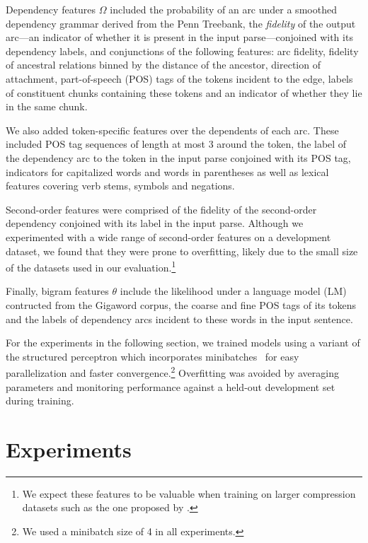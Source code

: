 \documentclass[11pt,a4paper]{article}
\begin{document}
Dependency features $\Omega$ included the probability of an arc under
a smoothed dependency grammar derived from the Penn Treebank, the
\emph{fidelity} of the output arc---an indicator of whether it is present in
the input parse---conjoined with its dependency labels, and conjunctions
of the following features: arc fidelity, fidelity of ancestral relations
binned by the distance of the ancestor, direction of attachment,
part-of-speech (POS) tags of the tokens incident to the edge, labels of
constituent chunks containing these tokens and an indicator of whether
they lie in the same chunk.

We also added token-specific features over the dependents of each
arc. These included POS tag sequences of length at most 3 around the token,
the label of the dependency arc to the token in the
input parse conjoined with its POS tag, indicators for
capitalized words and words in parentheses as well as lexical features
covering verb stems, symbols and negations.

Second-order features were comprised of the fidelity of the
second-order dependency conjoined with its label in the input parse.
Although we experimented with a wide range of second-order features on
a development dataset, we found that they were prone to overfitting,
likely due to the small size of the 
datasets used in our evaluation.\footnote{We
    expect these features to be valuable when training on larger
    compression datasets such as the one proposed by
    .}

Finally, bigram features $\theta$ include the likelihood under a
language model (LM) contructed from the Gigaword corpus, the coarse and
fine POS tags of its tokens and the labels of dependency arcs incident to
these words in the input sentence.

For the experiments in the following section, we trained models using
a variant of the structured perceptron \cite{collins02}
which incorporates minibatches~\cite{zhao13} for easy parallelization and
faster convergence.\footnote{
    We used a minibatch size of 4 in all experiments.}
Overfitting was avoided by averaging parameters and monitoring performance
against a held-out development set during training.

\section{Experiments}
\label{experiments}
\end{document}
